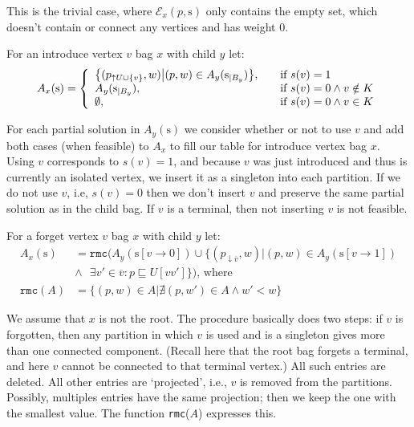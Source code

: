 \documentclass{llncs}
\begin{document}
This is the trivial case, where $\mathcal{E}_{x}(p, \mathrm{s})$ only contains the empty set, which doesn't contain or connect any vertices and has weight 0. 

For an introduce vertex $v$ bag $x$ with child $y$ let:
\[
A_{x}(\mathrm{s}) = \left\{ \begin{array}{l l} 
\big\{(p_{\uparrow U \cup \{v\}}, w) \big| (p,w) \in A_{y}(\mathrm{s}_{|B_{y}}) \big\}, & \quad \mbox{if } s(v)=1 \\
A_{y}(\mathrm{s}_{|B_{y}}), & \quad \mbox{if } s(v) = 0 \wedge v \notin K \\
\emptyset, & \quad \mbox{if } s(v) = 0 \wedge v \in K \\
\end{array}\right.
\]

For each partial solution in $A_{y}(\mathrm{s})$ we consider whether or not to use $v$ and add both cases (when feasible) to $A_{x}$ to fill our table for introduce vertex bag $x$. Using $v$ corresponds to $s(v)=1$, and because $v$ was just introduced and thus is currently an isolated vertex,
we insert it as a singleton into each partition. 
If we do not use $v$, i.e, $s(v)=0$ then we don't insert $v$ and preserve the same partial solution as in the child bag. If $v$ is a terminal, then not inserting $v$ is not feasible. 

For a forget vertex $v$ bag $x$ with child $y$ let:
\begin{align*}
A_{x}(\mathrm{s}) & = \texttt{rmc}(A_{y}(\mathrm{s}[v \rightarrow 0]) 
\cup \Big\{ (p_{\downarrow \overline{v}},w) \Big| (p, w) \in A_{y}(\mathrm{s}[v \rightarrow 1]) \\
&\wedge \mbox{ }\exists v' \in \overline{v}: p \sqsubseteq U[vv'] \Big\}) \text{, where}\\
\texttt{rmc}(A) &= \big\{ (p,w) \in A \big| \nexists (p, w') \in A \wedge w' < w \big\}
\end{align*}

We assume that $x$ is not the root.
The procedure basically does two steps: if $v$ is forgotten, then any partition in which $v$ is used and is a singleton gives more than one connected component. (Recall here
that the root bag forgets a terminal, and here $v$ cannot be connected to that terminal vertex.) All such entries are deleted. All other entries are `projected', i.e.,
$v$ is removed from the partitions. Possibly, multiples entries have the same projection; then we keep the one with the smallest value. The function  \texttt{rmc}($A$) expresses this.
\end{document}
